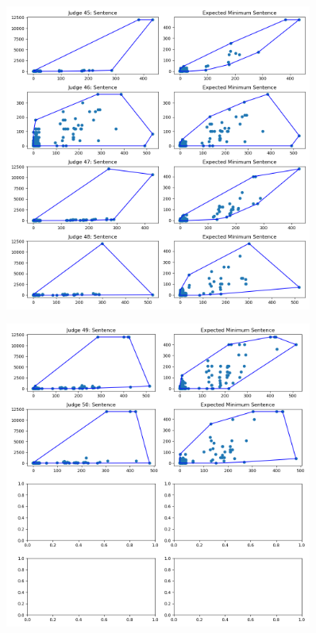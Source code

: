 \documentclass[11pt]{article}
\begin{document}
  \begin{figure}[H]
    \centering
    \includegraphics[width=0.9\textwidth]{../../../output/figures/Exploration/judge_convex_hulls_11.png}
  \end{figure}

  \begin{figure}[H]
    \centering
    \includegraphics[width=0.9\textwidth]{../../../output/figures/Exploration/judge_convex_hulls_12.png}
  \end{figure}
\end{document}
